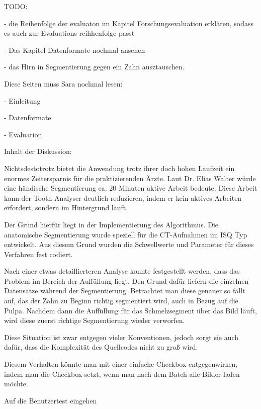 TODO:

- die Reihenfolge der evaluaton im Kapitel Forschungsevaluation erklären, sodass
es auch zur Evaluations reihhenfolge passt

- Das Kapitel Datenformate nochmal ansehen

- das Hirn in Segmentierung gegen ein Zahn ausztauschen.

Diese Seiten muss Sara nochmal lesen:

- Einleitung

- Datenformate

- Evaluation


Inhalt der Diskussion:

Nichtsdestotrotz bietet die Anwendung trotz ihrer doch hohen Laufzeit ein enormes
Zeitersparnis für die praktizierenden Ärzte. Laut Dr. Elias Walter würde eine händische
Segmentierung ca. 20 Minuten aktive Arbeit bedeute. Diese Arbeit kann der Tooth Analyser
deutlich reduzieren, indem er kein aktives Arbeiten erfordert, sondern im Hintergrund
läuft.

Der Grund hierfür liegt in der Implementierung des Algorithmus. Die anatomische
Segmentierung wurde speziell für die \ac{CT}-Aufnahmen im \ac{ISQ} Typ
entwickelt. Aus diesem Grund wurden die Schwellwerte und Parameter für dieses Verfahren
fest codiert.

Nach einer etwas detaillierteren Analyse konnte festgestellt werden, dass das
Problem im Bereich der Auffüllung liegt. Den Grund dafür liefern die einzelnen Datensätze
während der Segmentierung. Betrachtet man diese genauer so fällt auf, das der Zahn
zu Beginn richtig segmentiert wird, auch in Bezug auf die Pulpa. Nachdem dann die
Auffüllung für das Schmelzsegment über das Bild läuft, wird diese zuerst
richtige Segmentierung wieder verworfen.

Diese Situation ist zwar entgegen vieler Konventionen, jedoch sorgt sie auch dafür,
dass die Komplexität des Quellcodes nicht zu groß wird.

Diesem Verhalten könnte man mit einer einfache Checkbox entgegenwirken, indem man
die Checkbox setzt, wenn man nach dem Batch alle Bilder laden möchte.

Auf die Benutzertest eingehen